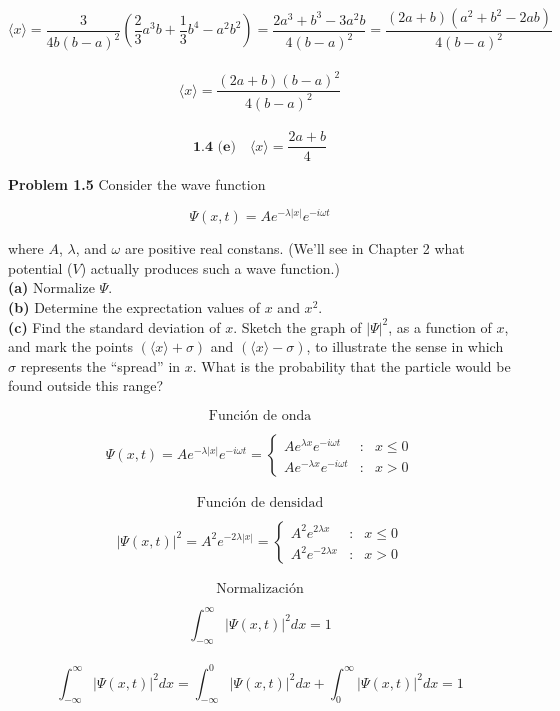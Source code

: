 \documentclass[10pt,a4papper]{article}
\begin{document}
\[\langle x\rangle=
\frac{3}{4b(b-a)^2}\left(\frac{2}{3}a^3b+\frac{1}{3}b^4-a^2b^2\right)=
\frac{2a^3+b^3-3a^2b}{4(b-a)^2}=
\frac{(2a+b)(a^2+b^2-2ab)}{4(b-a)^2}\]\\

\[\langle x\rangle=\frac{(2a+b)(b-a)^2}{4(b-a)^2}\]\\

\[\boxed{\textbf{1.4 (e)}\quad\langle x\rangle=\frac{2a+b}{4}}\]

\newpage
\textbf{Problem 1.5} Consider the wave function

\[\Psi(x,t)=Ae^{-\lambda|x|}e^{-i\omega t}\]

where $A$, $\lambda$, and $\omega$ are positive real constans. (We'll see in Chapter 2 what
potential ($V$) actually produces such a wave function.)\\

\textbf{(a)} Normalize $\Psi$.\\
\textbf{(b)} Determine the exprectation values of $x$ and $x^2$.\\
\textbf{(c)} Find the standard deviation of $x$. Sketch the graph of $|\Psi|^2$, as a function
of $x$, and mark the points $(\langle x\rangle+\sigma)$ and $(\langle x\rangle-\sigma)$, to illustrate the sense in
which $\sigma$ represents the ``spread'' in $x$. What is the probability that the
particle would be found outside this range?

\newpage
\[\text{Función de onda}\]

\[\Psi(x,t)=
Ae^{-\lambda|x|}e^{-i\omega t}=
\left\{\begin{array}{lll}
Ae^{\lambda x}e^{-i\omega t} & : & x\leq 0\\
Ae^{-\lambda x}e^{-i\omega t} & : & x>0
\end{array}\]\\

\[\text{Función de densidad}\]

\[|\Psi(x,t)|^2=
A^2e^{-2\lambda|x|}=
\left\{\begin{array}{lll}
A^2e^{2\lambda x} & : & x\leq 0\\
A^2e^{-2\lambda x} & : & x>0
\end{array}\]\\

\[\text{Normalización}\]

\[\int_{-\infty}^\infty|\Psi(x,t)|^2dx=1\]\\

\[\int_{-\infty}^\infty|\Psi(x,t)|^2dx=
\int_{-\infty}^0|\Psi(x,t)|^2dx+\int_0^\infty|\Psi(x,t)|^2dx=1\]
\end{document}
